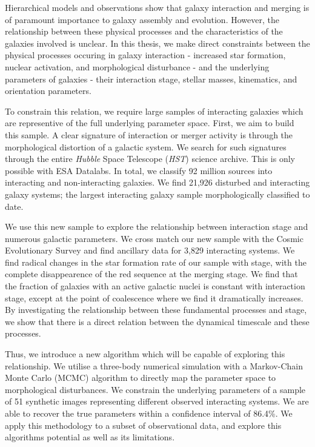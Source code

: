

\begin{abstracts}        %
Hierarchical models and observations show that galaxy interaction and merging is of paramount importance to galaxy assembly and evolution. However, the relationship between these physical processes and the characteristics of the galaxies involved is unclear. In this thesis, we make direct constraints between the physical processes occuring in galaxy interaction - increased star formation, nuclear activation, and morphological disturbance - and the underlying parameters of galaxies - their interaction stage, stellar masses, kinematics, and orientation parameters. 

To constrain this relation, we require large samples of interacting galaxies which are representive of the full underlying parameter space. First, we aim to build this sample. A clear signature of interaction or merger activity is through the morphological distortion of a galactic system. We search for such signatures through the entire \textit{Hubble} Space Telescope (\textit{HST}) science archive. This is only possible with ESA Datalabs. In total, we classify 92 million sources into interacting and non-interacting galaxies. We find 21,926 disturbed and interacting galaxy systems; the largest interacting galaxy sample morphologically classified to date. 

We use this new sample to explore the relationship between interaction stage and numerous galactic parameters. We cross match our new sample with the Cosmic Evolutionary Survey and find ancillary data for 3,829 interacting systems. We find radical changes in the star formation rate of our sample with stage, with the complete disappearence of the red sequence at the merging stage. We find that the fraction of galaxies with an active galactic nuclei is constant with interaction stage, except at the point of coalescence where we find it dramatically increases. By investigating the relationship between these fundamental processes and stage, we show that there is a direct relation between the dynamical timescale and these processes.

Thus, we introduce a new algorithm which will be capable of exploring this relationship. We utilise a three-body numerical simulation with a Markov-Chain Monte Carlo (MCMC) algorithm to directly map the parameter space to morphological disturbances. We constrain the underlying parameters of a sample of 51 synthetic images representing different observed interacting systems. We are able to recover the true parameters within a confidence interval of 86.4\%. We apply this methodology to a subset of observational data, and explore this algorithms potential as well as its limitations.

\end{abstracts}



